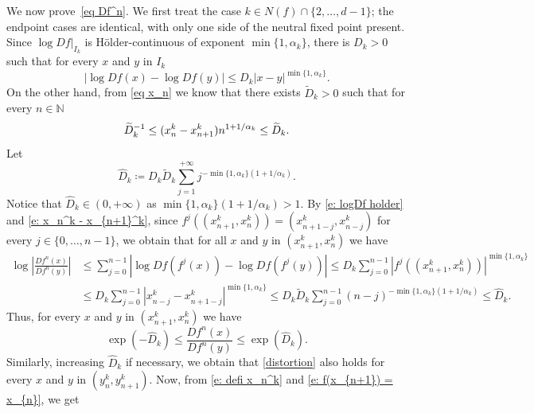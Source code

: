 \documentclass[12pt]{amsart}
\numberwithin{equation}{section} %
\numberwithin{figure}{section} %
\theoremstyle{plain}
\theoremstyle{definition}
\theoremstyle{remark}
\theoremstyle{citing}
\newcommand{\N}{\mathbb{N}}
\renewcommand{\=}{\coloneqq}
\begin{document}
    We now prove~\eqref{eq Df^n}. We first treat the case $k\in N(f)\cap\{2,\ldots,d-1\}$; the endpoint cases are identical, with only one side of the neutral fixed point present. Since $\log Df|_{I_k}$ is Hölder-continuous of exponent $\min\{1,\alpha_k\}$, there is $D_k >0$ such that for every $x$ and $y$ in $I_k$ 
    \begin{equation}\label{e: logDf holder}
        |\log Df(x) - \log Df(y)|\leq D_k |x-y|^{\min\{1,\alpha_k\}}.
    \end{equation}
    On the other hand, from \eqref{eq x_n} we know that there exists $\widetilde{D}_k>0$ such that for every $n\in \N$
    \begin{equation}\label{e: x_n^k - x_{n+1}^k}
        \widetilde{D}_k^{-1}\leq (x_n^k-x_{n+1}^k) n^{1+1/\alpha_k}\leq \widetilde{D}_k. 
    \end{equation}
    Let 
    \begin{equation*}
        \widehat{D}_k\= D_k\widetilde{D}_k \sum_{j=1}^{+\infty} j^{-\min\{1,\alpha_k\}(1+1/\alpha_k)}.
    \end{equation*}
    Notice that $\widehat{D}_k\in(0,+\infty)$ as $\min\{1,\alpha_k\}(1+1/\alpha_k)>1$. By \eqref{e: logDf holder} and \eqref{e: x_n^k - x_{n+1}^k}, since $f^j((x_{n+1}^k,x_n^k))=(x_{n+1-j}^k,x_{n-j}^k)$ for every $j\in \{0,\ldots,n-1\}$, we obtain that for all $x$ and $y$ in $(x_{n+1}^k,x_n^k)$ we have
    \begin{equation*}
    \begin{split}
        \log\left|\frac{Df^n(x)}{Df^n(y)}\right| &\leq \sum_{j=0}^{n-1}|\log Df(f^j(x))-\log Df(f^{j}(y))| \leq D_k \sum_{j=0}^{n-1}|f^j((x_{n+1}^k,x_n^k))|^{\min\{1,\alpha_k\}}\\
        &\leq  D_k\sum_{j=0}^{n-1} |x_{n-j}^k-x_{n+1-j}^k|^{\min\{1,\alpha_k\}} \leq D_k\widetilde{D}_k \sum_{j=0}^{n-1} (n-j)^{-\min\{1,\alpha_k\}(1+1/\alpha_k)} \leq \widehat{D}_k.
        \end{split}
    \end{equation*}
    Thus, for every $x$ and $y$ in $(x_{n+1}^k,x_n^k)$ we have 
    \begin{equation}\label{distortion}
      \exp(-\widehat{D}_k) \leq \frac{Df^n(x)}{Df^n(y)}\leq \exp(\widehat{D}_k).
    \end{equation}
    Similarly, increasing $\widehat{D}_k$ if necessary, we obtain that \eqref{distortion} also holds for every $x$ and $y$ in $(y_n^k,y_{n+1}^k)$. Now, from \eqref{e: defi x_n^k} and \eqref{e: f(x_{n+1}) = x_{n}}, we get 
\end{document}
